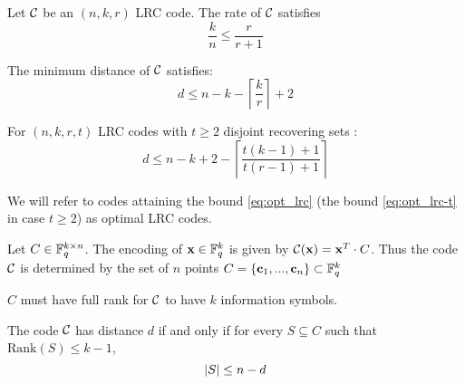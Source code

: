 \begin{thm}
Let ${\mathcal C}$ be an $(n,k,r)$ LRC code. The rate of ${\mathcal C}$ satisfies
\begin{equation}
    \frac{k}{n} \leq \frac{r}{r+1}
\end{equation}

\noindent The minimum distance of ${\mathcal C}$ satisfies:
\begin{equation}\label{eq:opt_lrc}
d \leq n -k - \left\lceil \frac{k}{r} \right\rceil + 2
\end{equation}


\end{thm}


\begin{thm}

For $(n,k,r,t)$ LRC codes with $t \geq 2$ disjoint recovering sets :
\begin{equation}\label{eq:opt_lrc-t}
    d \leq n-k + 2 - \left\lceil \frac{t(k-1)+1}{t(r-1)+1} \right\rceil
\end{equation}
\end{thm}

We will refer to codes attaining the bound \ref{eq:opt_lrc} (the bound \ref{eq:opt_lrc-t} in case $t \geq 2$) as optimal LRC codes.

Let $C \in {\mathbb F}_q^{k \times n}$. The encoding of $\mathbf{x} \in {\mathbb F}_q^k$ is given by ${\mathcal C}(\mathbf{x}) = \mathbf{x}^T \cdot C$. Thus the code ${\mathcal C}$ is determined by the set of $n$ points $C = \{ \mathbf{c}_1, ... , \mathbf{c}_n \} \subset {\mathbb F}_q^k$

$C$ must have full rank for ${\mathcal C}$ to have $k$ information symbols.

The code ${\mathcal C}$ has distance $d$ if and only if for every $S \subseteq C$ such that $\mbox{Rank}(S) \leq k-1$, 
\begin{equation}
\left\vert {S} \right\vert \leq n-d
\end{equation}